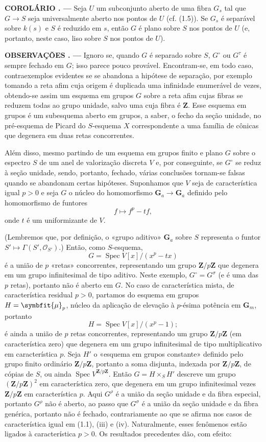 \documentclass[11pt,twoside,openany]{book}
\numberwithin{equation}{section}
\newcommand{\src}[1]{%
  \phantomsection\hypertarget{src:#1}{}%
  \marginpar{\raggedleft\footnotesize\sffamily #1}%
}
\theoremstyle{plain}
\theoremstyle{definition}
\theoremstyle{remark}
\newcommand{\result}[2]{%
  \par\medskip\noindent\textbf{#1%
  \if\relax\detokenize{#2}\relax\else\space#2\fi. ---}\enspace
}
\newcommand{\FgaUnitKey}{frontmatter}
\renewcommand{\src}[1]{%
  \phantomsection\hypertarget{src:\FgaUnitKey:#1}{}%
  \marginpar{\raggedleft\footnotesize\sffamily #1}%
}
\renewcommand{\boldsymbol}[1]{\symbfit{#1}}
\begin{document}
\result{COROLÁRIO}{1.8} Seja $U$ um subconjunto aberto de uma fibra $G_s$ tal
que $G\longrightarrow S$ seja universalmente aberto nos pontos de $U$ (cf.
(1.5)). Se $G_s$ é separável sobre $k(s)$ e $S$ é reduzido em $s$, então $G$ é
plano sobre $S$ nos pontos de $U$ (e, portanto, neste caso, liso sobre $S$ nos
pontos de $U$).

\result{OBSERVAÇÕES}{1.9} Ignoro se, quando $G$ é separado sobre $S$,
$G^\circ$ ou $G^\tau$ é sempre fechado em $G$; isso parece pouco provável.
Encontram-se, em todo caso, contraexemplos evidentes se se abandona a hipótese
de separação, por exemplo tomando a reta afim cuja origem é duplicada uma
infinidade enumerável de vezes, obtendo-se assim um esquema em grupos $G$ sobre
a reta afim cujas fibras se reduzem todas ao grupo unidade, salvo uma cuja
fibra é $\mathbf Z$. Esse esquema em grupos é um subesquema aberto em grupos,
a saber, o fecho da seção unidade, no pré-esquema de Picard do $S$-esquema $X$
correspondente a uma família de cônicas que degenera em duas retas concorrentes.

Além disso, mesmo partindo de um esquema em grupos finito e plano $G$ sobre o
espectro $S$ de um anel de valorização discreta $V$ e, por conseguinte, se
$G^\circ$ se reduz à seção unidade, sendo, portanto, fechado, várias
conclusões tornam-se falsas quando se abandonam certas hipóteses. Suponhamos
que $V$ seja de característica igual $p>0$ e seja $G$ o núcleo do homomorfismo
$\mathbf G_a\longrightarrow\mathbf G_a$ definido pelo homomorfismo de
funtores
\[
f\longmapsto f^p-tf,
\]
onde $t$ é um uniformizante de $V$.
\src{230}
(Lembremos que, por definição, o «grupo aditivo» $\mathbf G_a$ sobre $S$
representa o funtor $S'\longmapsto\Gamma(S',\mathcal O_{S'})$.) Então, como
$S$-esquema,
\[
G=\operatorname{Spec}V[x]/(x^p-tx)
\]
é a união de $p$ «retas» concorrentes, representando um grupo
$\mathbf Z/p\mathbf Z$ que degenera em um grupo infinitesimal de tipo aditivo.
Neste exemplo, $G^\circ=G^\sigma$ (e é uma das $p$ retas), portanto não é
aberto em $G$. No caso de característica mista, de característica residual
$p>0$, partamos do esquema em grupos $H=\boldsymbol\mu_p$, núcleo da aplicação
de elevação à $p$-ésima potência em $\mathbf G_m$, portanto
\[
H=\operatorname{Spec}V[x]/(x^p-1) ;
\]
é ainda a união de $p$ retas concorrentes, representando um grupo
$\mathbf Z/p\mathbf Z$ (em característica zero) que degenera em um grupo
infinitesimal de tipo multiplicativo em característica $p$. Seja $H'$ o
«esquema em grupos constante» definido pelo grupo finito ordinário
$\mathbf Z/p\mathbf Z$, portanto a soma disjunta, indexada por
$\mathbf Z/p\mathbf Z$, de cópias de $S$, ou ainda
$\operatorname{Spec}V^{\mathbf Z/p\mathbf Z}$. Então $G=H\times_S H'$ descreve
um grupo $(\mathbf Z/p\mathbf Z)^2$ em característica zero, que degenera em um
grupo infinitesimal vezes $\mathbf Z/p\mathbf Z$ em característica $p$. Aqui
$G^\rho$ é a união da seção unidade e da fibra especial, portanto $G^\rho$ não
é aberto, ao passo que $G^\sigma$ é a união da seção unidade e da fibra
genérica, portanto não é fechado, contrariamente ao que se afirma nos casos de
característica igual em (1.1), (iii) e (iv). Naturalmente, esses fenômenos estão
ligados à característica $p>0$. Os resultados precedentes dão, com efeito:
\end{document}
